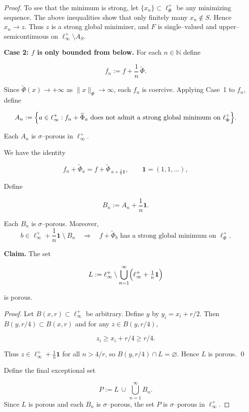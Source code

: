 \documentclass[12pt]{article}
\theoremstyle{thmstyleone}%
\theoremstyle{thmstyletwo}%
\theoremstyle{thmstylethree}%
\begin{document}
{{{{\begin{proof}
To see that the minimum is strong, let $\{x_n\}\subset \ell_\Phi^+$ be any minimizing sequence.
The above inequalities show that only finitely many  $x_n\not \in S$.
Hence $x_n\to z$.  
Thus $z$ is a strong global minimizer, and $F$ is single--valued and 
upper--semicontinuous on $\ell_\infty^+\setminus A_S$.

\medskip
\textbf{Case 2: $f$ is only bounded from below.}
For each $n\in\mathbb{N}$ define


\[
f_n := f + \frac{1}{n}\,\widetilde{\Phi}.
\]


Since $\widetilde{\Phi}(x)\to+\infty$ as $\|x\|_\Phi\to\infty$, each $f_n$ is
coercive.  
Applying Case~1 to $f_n$, define


\[
A_n :=
\Bigl\{
a\in\ell_\infty^+ :
f_n+\widetilde{\Phi}_a
\text{ does not admit a strong global minimum on }\ell_\Phi^+
\Bigr\}.
\]


Each $A_n$ is $\sigma$--porous in $\ell_\infty^+$.

We have the identity


\[
f_n+\widetilde{\Phi}_a
= f+\widetilde{\Phi}_{\,a+\frac{1}{n}\mathbf{1}},
\qquad \mathbf{1}=(1,1,\dots),
\]


Define


\[
B_n := A_n + \frac{1}{n}\mathbf{1}.
\]


Each $B_n$ is $\sigma$--porous.  
Moreover,
\begin{equation}\label{eq:por2-final}
b\in \ell_\infty^+ + \frac{1}{n}\mathbf{1}\ \setminus\ B_n
\quad\Longrightarrow\quad
f+\widetilde{\Phi}_b
\text{ has a strong global minimum on }\ell_\Phi^+.
\end{equation}

\medskip
\textbf{Claim.}
The set


\[
L :=
\ell_\infty^+ \setminus 
\bigcup_{n=1}^\infty 
\Bigl(\ell_\infty^+ + \tfrac{1}{n}\mathbf{1}\Bigr)
\]


is porous.

\emph{Proof.}
Let $B(x,r)\subset\ell_\infty^+$ be arbitrary.  
Define $y$ by $y_i=x_i+r/2$.  
Then $B(y,r/4)\subset B(x,r)$ and for any $z\in B(y,r/4)$,


\[
z_i\ge x_i+r/4\ge r/4.
\]


Thus $z\in \ell_\infty^+ + \frac{1}{n}\mathbf{1}$ for all $n>4/r$, so
$B(y,r/4)\cap L=\varnothing$.  
Hence $L$ is porous.  \qed

\medskip

Define the final exceptional set


\[
P := L \,\cup\, \bigcup_{n=1}^\infty B_n.
\]
Since $L$ is porous and each $B_n$ is $\sigma$--porous, the set $P$ is
$\sigma$--porous in $\ell_\infty^+$.


\end{proof}}}}}
\end{document}

